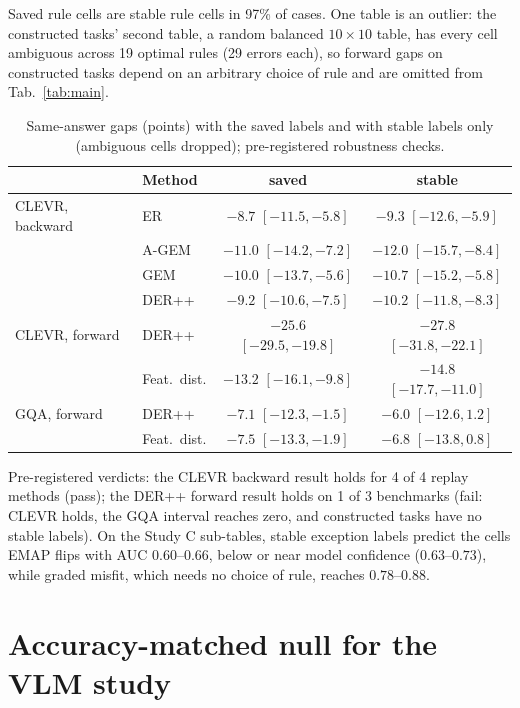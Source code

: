\noindent
Saved rule cells are stable rule cells in 97\% of cases. One table is an outlier: the constructed tasks' second table,
a random balanced $10\times10$ table, has every cell ambiguous across 19 optimal rules (29 errors each), so forward
gaps on constructed tasks depend on an arbitrary choice of rule and are omitted from Tab.~\ref{tab:main}.

\begin{table}[h]
\centering\small\setlength{\tabcolsep}{3pt}
\caption{Same-answer gaps (points) with the saved labels and with stable labels only (ambiguous cells dropped);
pre-registered robustness checks.}
\label{tab:unique_cl}
\begin{tabular}{llcc}
\toprule
 & Method & saved & stable \\
\midrule
CLEVR, backward & ER     & $-8.7$ $[-11.5,-5.8]$  & $-9.3$ $[-12.6,-5.9]$ \\
                & A-GEM  & $-11.0$ $[-14.2,-7.2]$ & $-12.0$ $[-15.7,-8.4]$ \\
                & GEM    & $-10.0$ $[-13.7,-5.6]$ & $-10.7$ $[-15.2,-5.8]$ \\
                & DER++  & $-9.2$ $[-10.6,-7.5]$  & $-10.2$ $[-11.8,-8.3]$ \\
CLEVR, forward  & DER++  & $-25.6$ $[-29.5,-19.8]$ & $-27.8$ $[-31.8,-22.1]$ \\
                & Feat.\ dist. & $-13.2$ $[-16.1,-9.8]$ & $-14.8$ $[-17.7,-11.0]$ \\
GQA, forward    & DER++  & $-7.1$ $[-12.3,-1.5]$  & $-6.0$ $[-12.6,1.2]$ \\
                & Feat.\ dist. & $-7.5$ $[-13.3,-1.9]$ & $-6.8$ $[-13.8,0.8]$ \\
\bottomrule
\end{tabular}
\end{table}

\noindent
Pre-registered verdicts: the CLEVR backward result holds for 4 of 4 replay methods (pass); the DER++ forward result
holds on 1 of 3 benchmarks (fail: CLEVR holds, the GQA interval reaches zero, and constructed tasks have no stable
labels). On the Study C sub-tables, stable exception labels predict the cells EMAP flips with AUC $0.60$--$0.66$, below
or near model confidence ($0.63$--$0.73$), while graded misfit, which needs no choice of rule, reaches $0.78$--$0.88$.

\section{Accuracy-matched null for the VLM study}
\label{sup:null}

